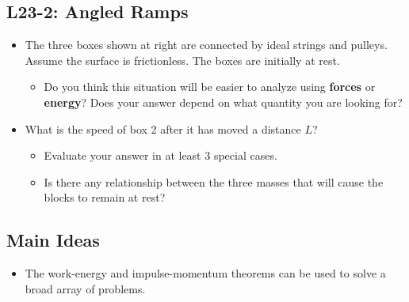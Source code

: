 \documentclass[]{article}
\newcommand{\Week}{23}
\begin{document}
\begin{PresentSpace}
\vspace{-10pt}
\section*{L\Week-2: Angled Ramps}
\vspace{-10pt}
\begin{center}
\end{center}
\begin{itemize}
	\large
	\item The three boxes shown at right are connected by ideal strings and pulleys. Assume the surface is frictionless. The boxes are initially at rest.
	\begin{itemize}
		\item Do you think this situation will be easier to analyze using \textbf{forces} or \textbf{energy}? Does your answer depend on what quantity you are looking for?
	\end{itemize}
	\item What is the speed of box 2 after it has moved a distance $L$?
	\begin{itemize}
		\item Evaluate your answer in at least 3 special cases.
		\item Is there any relationship between the three masses that will cause the blocks to remain at rest?
	\end{itemize}
\end{itemize}
\end{PresentSpace}
\newpage
\begin{TeacherMargin}
	
\end{TeacherMargin}
\begin{PresentSpace}
\section*{Main Ideas}
\begin{itemize}
	\item The work-energy and impulse-momentum theorems can be used to solve a broad array of problems.
\end{itemize}
\end{PresentSpace}
\end{document}
